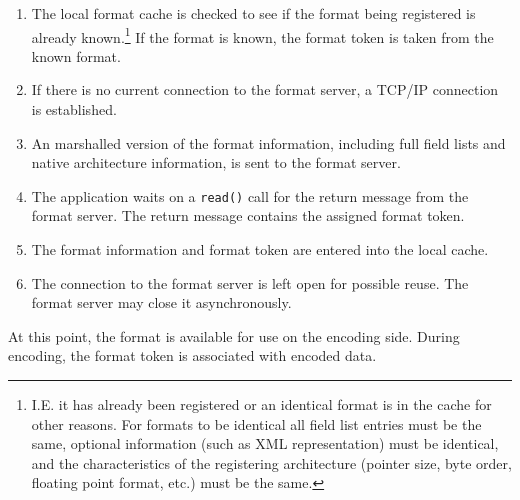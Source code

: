 \documentclass{article}
\begin{document}
\begin{enumerate}
\item The local format cache is checked to see if the format being
registered is already known.\footnote{I.E. it has already been registered or
an identical format is in the cache for other reasons.  For formats to be
identical all field list entries must be the same, optional information
(such as XML representation) must be identical, and the characteristics of
the registering architecture (pointer size, byte order, floating point
format, etc.) must be the same.}  If the format is known, the format token
is taken from the known format.
\item If there is no current connection to the format server, a TCP/IP
connection is established.
\item An marshalled version of the format information, including full field
lists and native architecture information, is sent to the format server.
\item The application waits on a {\tt read()} call for the return message
from the format server.  The return message contains the assigned format
token.
\item The format information and format token are entered into the local
cache. 
\item The connection to the format server is left open for possible reuse.
The format server may close it asynchronously.
\end{enumerate}
At this point, the format is available for use on the encoding side.  During
encoding, the format token is associated with encoded data.
\end{document}
